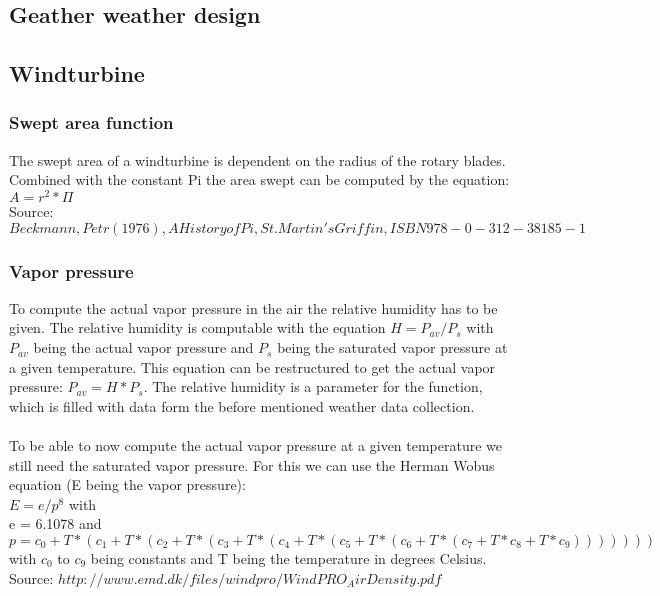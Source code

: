 \subsection{Geather weather design}

\subsection{Windturbine}
\subsubsection{Swept area function}
The swept area of a windturbine is dependent on the radius of the rotary blades. Combined with the constant Pi the area swept can be computed by the equation: $A = r^{2}* \Pi $\\
Source: $Beckmann, Petr (1976), A History of Pi, St. Martin's Griffin, ISBN 978-0-312-38185-1$
\subsubsection{Vapor pressure}
To compute the actual vapor pressure in the air the relative humidity has to be given. The relative humidity is computable with the equation $H = P_{av} / P_s$ with $P_{av}$ being the actual vapor pressure and $P_s$ being the saturated vapor pressure at a given temperature. This equation can be restructured to get the actual vapor pressure: $P_{av}  = H * P_s$. The relative humidity is a parameter for the function, which is filled with data form the before mentioned weather data collection.\\
\\
To be able to now compute the actual vapor pressure at a given temperature we still need the saturated vapor pressure. For this we can use the Herman Wobus equation (E being the vapor pressure):\\
$E = e/p^{8}$ with\\
e = 6.1078 and\\
$p = c_0 + T * (c_1 + T * (c_2 + T * (c_3 + T * (c_4 + T *(c_5 + T * (c_6 + T * (c_7 + T * c_8 + T * c_9)))))))$\\
with $c_0$ to $c_9$ being constants and T being the temperature in degrees Celsius.\\
Source: $http://www.emd.dk/files/windpro/WindPRO_AirDensity.pdf$
